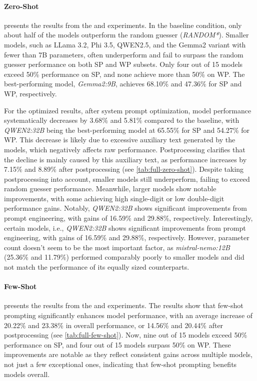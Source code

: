 \paragraph{Zero-Shot}

 presents the results from the  and  experiments. In the baseline condition, only about half of the models outperform the random guesser (\textit{RANDOM*}). Smaller models, such as LLama 3.2, Phi 3.5, QWEN2.5, and the Gemma2 variant with fewer than 7B parameters, often underperform and fail to surpass the random guesser performance on both \ac{SP} and \ac{WP} subsets. Only four out of 15 models exceed 50\% performance on \ac{SP}, and none achieve more than 50\% on \ac{WP}. The best-performing model, \textit{Gemma2:9B}, achieves 68.10\% and 47.36\% for \ac{SP} and \ac{WP}, respectively.

For the optimized results, after system prompt optimization, model performance systematically decreases by 3.68\% and 5.81\% compared to the baseline, with \textit{QWEN2:32B} being the best-performing model at 65.55\% for \ac{SP} and 54.27\% for \ac{WP}. This decrease is likely due to excessive auxiliary text generated by the models, which negatively affects raw performance. Postprocessing clarifies that the decline is mainly caused by this auxiliary text, as performance increases by 7.15\% and 8.89\% after postprocessing (see \cref{tab:full-zero-shot}). Despite taking postprocessing into account, smaller models still underperform, failing to exceed random guesser performance. Meanwhile, larger models show notable improvements, with some achieving high single-digit or low double-digit performance gains. Notably, \textit{QWEN2:32B} shows significant improvements from prompt engineering, with gains of 16.59\% and 29.88\%, respectively. Interestingly, certain models, i.e., \textit{QWEN2:32B} shows significant improvements from prompt engineering, with gains of 16.59\% and 29.88\%, respectively. However, parameter count doesn't seem to be the most important factor, as \textit{mistral-nemo:12B} (25.36\% and 11.79\%) performed comparably poorly to smaller models and did not match the performance of its equally sized counterparts.

\paragraph{Few-Shot}

 presents the results from the  and  experiments. The results show that few-shot prompting significantly enhances model performance, with an average increase of 20.22\% and 23.38\% in overall performance, or 14.56\% and 20.44\% after postprocessing (see \cref{tab:full-few-shot}). Now, nine out of 15 models exceed 50\% performance on \ac{SP}, and four out of 15 models surpass 50\% on \ac{WP}. These improvements are notable as they reflect consistent gains across multiple models, not just a few exceptional ones, indicating that few-shot prompting benefits models overall.

